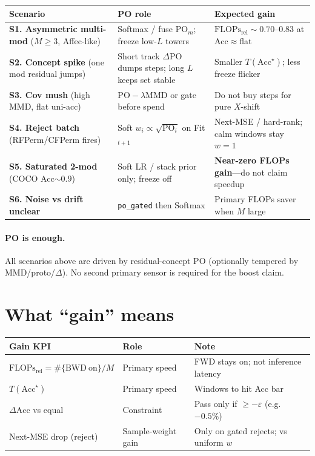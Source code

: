 \documentclass[11pt]{article}
\newcommand{\PO}{\mathrm{PO}}
\newcommand{\Flops}{\mathrm{FLOPs}_{\mathrm{rel}}}
\newcommand{\Acc}{\mathrm{Acc}}
\begin{document}
\begin{center}
\small
\begin{tabular}{@{}p{2.2cm}p{3.4cm}p{3.6cm}@{}}
\toprule
Scenario & PO role & Expected gain \\
\midrule
\textbf{S1. Asymmetric multi-mod}
  ($M\ge3$, Affec-like)
  & Softmax / fuse $\PO_m$; freeze low-$L$ towers
  & $\Flops\sim0.70$--$0.83$ at Acc$\approx$flat \\
\textbf{S2. Concept spike}
  (one mod residual jumps)
  & Short track $\Delta\PO$ dumps steps; long $L$ keeps set stable
  & Smaller $T(\Acc^\star)$; less freeze flicker \\
\textbf{S3. Cov mush}
  (high MMD, flat uni-acc)
  & $\PO-\lambda\mathrm{MMD}$ or gate before spend
  & Do not buy steps for pure $X$-shift \\
\textbf{S4. Reject batch}
  (RFPerm/CFPerm fires)
  & Soft $w_i\propto\sqrt{\PO_i}$ on Fit$_{t+1}$
  & Next-MSE / hard-rank; calm windows stay $w{=}1$ \\
\textbf{S5. Saturated 2-mod}
  (COCO Acc$\sim0.9$)
  & Soft LR / stack prior only; freeze off
  & \textbf{Near-zero FLOPs gain}---do not claim speedup \\
\textbf{S6. Noise vs drift unclear}
  & \texttt{po\_gated} then Softmax
  & Primary FLOPs saver when $M$ large \\
\bottomrule
\end{tabular}
\end{center}

\paragraph{PO is enough.}
All scenarios above are driven by residual-concept $\PO$
(optionally tempered by MMD/proto/$\Delta$).
No second primary sensor is required for the boost claim.

\section{What ``gain'' means}
\label{sec:gain}

\begin{center}
\small
\begin{tabular}{@{}llp{5.4cm}@{}}
\toprule
Gain KPI & Role & Note \\
\midrule
$\Flops=\#\{\mathrm{BWD\ on}\}/M$
  & Primary speed
  & FWD stays on; not inference latency \\
$T(\Acc^\star)$
  & Primary speed
  & Windows to hit Acc bar \\
$\Delta\Acc$ vs equal
  & Constraint
  & Pass only if $\ge-\varepsilon$ (e.g.\ $-0.5\%$) \\
Next-MSE drop (reject)
  & Sample-weight gain
  & Only on gated rejects; vs uniform $w$ \\
\bottomrule
\end{tabular}
\end{center}
\end{document}
